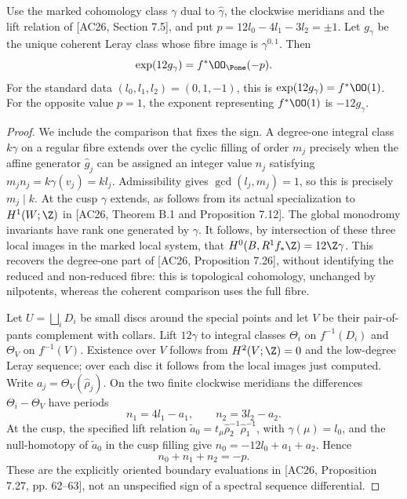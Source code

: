 \begin{proposition}\label{inv:C3.2}
Use the marked cohomology class $\gamma$ dual to
$\hat\gamma$, the clockwise meridians and the lift relation of
[AC26, Section 7.5], and put
$p=12l_0-4l_1-3l_2=\pm1$.  Let $g_\gamma$ be the unique coherent
Leray class whose fibre image is $\gamma^{0,1}$.  Then
\begin{equation}\label{inv:eq:C-factor12}
\exp(12g_\gamma)=f^*\OO_{\Pone}(-p).
\end{equation}
For the standard data $(l_0,l_1,l_2)=(0,1,-1)$, this is
$\exp(12g_\gamma)=f^*\OO(1)$.  For the opposite value $p=1$,
the exponent representing $f^*\OO(1)$ is $-12g_\gamma$.
\end{proposition}
\begin{proof}
We include the comparison that fixes the sign.  A degree-one integral
class $k\gamma$ on a regular fibre extends over the cyclic filling of
order $m_j$ precisely when the affine generator $\hat g_j$ can be
assigned an integer value $n_j$ satisfying
$m_j n_j=k\gamma(v_j)=kl_j$.  Admissibility gives
$\gcd(l_j,m_j)=1$, so this is precisely $m_j\mid k$.
At the cusp $\gamma$ extends, as follows from its actual specialization
to $H^1(W;\Z)$ in [AC26, Theorem B.1 and Proposition 7.12].
The global monodromy invariants have rank one generated by $\gamma$.
It follows, by intersection of these three local images in the marked
local system, that
$H^0(B,R^1f_*\Z)=12\Z\gamma$.  This recovers the degree-one
part of [AC26, Proposition 7.26], without identifying the reduced and
non-reduced fibre: this is topological cohomology, unchanged by
nilpotents, whereas the coherent comparison uses the full fibre.

Let $U=\bigsqcup_iD_i$ be small discs around the special points and
let $V$ be their pair-of-pants complement with collars.  Lift
$12\gamma$ to integral classes $\Theta_i$ on $f^{-1}(D_i)$ and
$\Theta_V$ on $f^{-1}(V)$.  Existence over $V$ follows from
$H^2(V;\Z)=0$ and the low-degree Leray sequence; over each disc it
follows from the local images just computed.  Write
$a_j=\Theta_V(\hat\rho_j)$.  On the two finite clockwise meridians
the differences $\Theta_i-\Theta_V$ have periods
\[
n_1=4l_1-a_1,\qquad n_2=3l_2-a_2.
\]
At the cusp, the specified lift relation
$\widetilde a_0=t_\mu\hat\rho_2^{-1}\hat\rho_1^{-1}$,
with $\gamma(\mu)=l_0$, and the null-homotopy of
$\widetilde a_0$ in the cusp filling give
$n_0=-12l_0+a_1+a_2$.  Hence
\begin{equation}\label{inv:eq:C-collar-sum}
n_0+n_1+n_2=-p.
\end{equation}
These are the explicitly oriented boundary evaluations in [AC26,
Proposition 7.27, pp. 62--63], not an unspecified sign of a spectral
sequence differential.


\end{proof}
